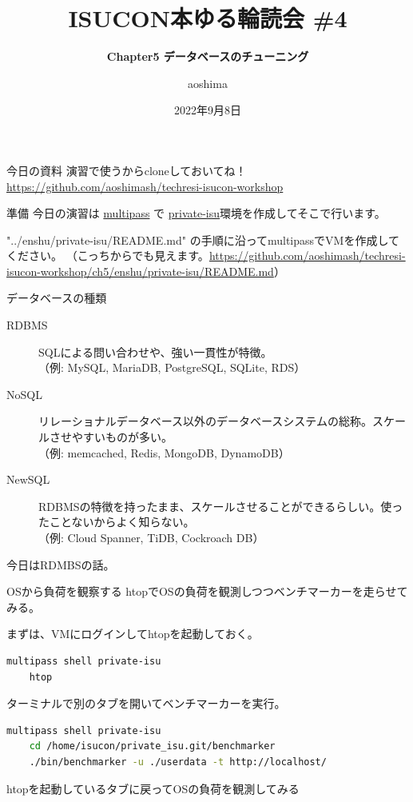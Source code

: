 \documentclass{beamer}
\title{\bfseries ISUCON本ゆる輪読会 \#4}
\subtitle{\bfseries Chapter5 データベースのチューニング}
\author{aoshima}
\date{2022年9月8日}
\begin{document}
\begin{frame}
  \titlepage
\end{frame}

\begin{frame}{今日の資料}
  演習で使うからcloneしておいてね！
  \href{https://github.com/aoshimash/techresi-isucon-workshop}{https://github.com/aoshimash/techresi-isucon-workshop}
\end{frame}

\begin{frame}{準備}
  今日の演習は \href{https://multipass.run/}{multipass} で \href{https://github.com/catatsuy/private-isu}{private-isu}環境を作成してそこで行います。\par
  "../enshu/private-isu/README.md" の手順に沿ってmultipassでVMを作成してください。\newline
  （こっちからでも見えます。\href{https://github.com/aoshimash/techresi-isucon-workshop/ch5/enshu/private-isu/README.md}{https://github.com/aoshimash/techresi-isucon-workshop/ch5/enshu/private-isu/README.md}）
\end{frame}

\begin{frame}{データベースの種類}

  \begin{description}
    \item[RDBMS]SQLによる問い合わせや、強い一貫性が特徴。\\（例: MySQL, MariaDB, PostgreSQL, SQLite, RDS）
    \item[NoSQL]リレーショナルデータベース以外のデータベースシステムの総称。スケールさせやすいものが多い。\\（例: memcached, Redis, MongoDB, DynamoDB）
    \item[NewSQL]RDBMSの特徴を持ったまま、スケールさせることができるらしい。使ったことないからよく知らない。\\（例: Cloud Spanner, TiDB, Cockroach DB）
  \end{description}

  今日はRDMBSの話。

\end{frame}

\begin{frame}[fragile]{OSから負荷を観察する}
  htopでOSの負荷を観測しつつベンチマーカーを走らせてみる。\par
  まずは、VMにログインしてhtopを起動しておく。
  \begin{lstlisting}[language=bash, basicstyle=\tiny]
    multipass shell private-isu
    htop
  \end{lstlisting}
  ターミナルで別のタブを開いてベンチマーカーを実行。
  \begin{lstlisting}[language=bash, basicstyle=\tiny]
    multipass shell private-isu
    cd /home/isucon/private_isu.git/benchmarker
    ./bin/benchmarker -u ./userdata -t http://localhost/
  \end{lstlisting}
  htopを起動しているタブに戻ってOSの負荷を観測してみる
\end{frame}
\end{document}
